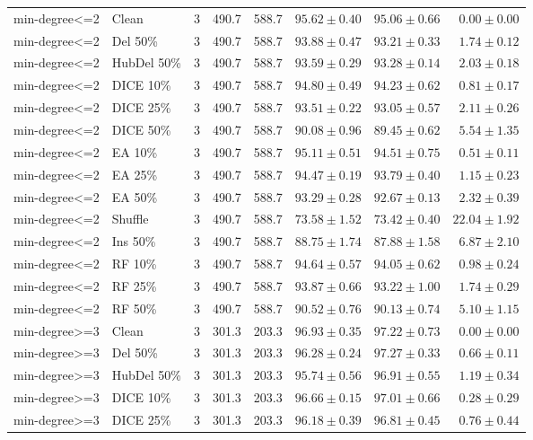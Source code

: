 {\begin{longtable}{llrrrrrr}
min-degree<=2 & Clean & 3 & 490.7 & 588.7 & $95.62\pm0.40$ & $95.06\pm0.66$ & $0.00\pm0.00$ \\
min-degree<=2 & Del 50\% & 3 & 490.7 & 588.7 & $93.88\pm0.47$ & $93.21\pm0.33$ & $1.74\pm0.12$ \\
min-degree<=2 & HubDel 50\% & 3 & 490.7 & 588.7 & $93.59\pm0.29$ & $93.28\pm0.14$ & $2.03\pm0.18$ \\
min-degree<=2 & DICE 10\% & 3 & 490.7 & 588.7 & $94.80\pm0.49$ & $94.23\pm0.62$ & $0.81\pm0.17$ \\
min-degree<=2 & DICE 25\% & 3 & 490.7 & 588.7 & $93.51\pm0.22$ & $93.05\pm0.57$ & $2.11\pm0.26$ \\
min-degree<=2 & DICE 50\% & 3 & 490.7 & 588.7 & $90.08\pm0.96$ & $89.45\pm0.62$ & $5.54\pm1.35$ \\
min-degree<=2 & EA 10\% & 3 & 490.7 & 588.7 & $95.11\pm0.51$ & $94.51\pm0.75$ & $0.51\pm0.11$ \\
min-degree<=2 & EA 25\% & 3 & 490.7 & 588.7 & $94.47\pm0.19$ & $93.79\pm0.40$ & $1.15\pm0.23$ \\
min-degree<=2 & EA 50\% & 3 & 490.7 & 588.7 & $93.29\pm0.28$ & $92.67\pm0.13$ & $2.32\pm0.39$ \\
min-degree<=2 & Shuffle & 3 & 490.7 & 588.7 & $73.58\pm1.52$ & $73.42\pm0.40$ & $22.04\pm1.92$ \\
min-degree<=2 & Ins 50\% & 3 & 490.7 & 588.7 & $88.75\pm1.74$ & $87.88\pm1.58$ & $6.87\pm2.10$ \\
min-degree<=2 & RF 10\% & 3 & 490.7 & 588.7 & $94.64\pm0.57$ & $94.05\pm0.62$ & $0.98\pm0.24$ \\
min-degree<=2 & RF 25\% & 3 & 490.7 & 588.7 & $93.87\pm0.66$ & $93.22\pm1.00$ & $1.74\pm0.29$ \\
min-degree<=2 & RF 50\% & 3 & 490.7 & 588.7 & $90.52\pm0.76$ & $90.13\pm0.74$ & $5.10\pm1.15$ \\
min-degree>=3 & Clean & 3 & 301.3 & 203.3 & $96.93\pm0.35$ & $97.22\pm0.73$ & $0.00\pm0.00$ \\
min-degree>=3 & Del 50\% & 3 & 301.3 & 203.3 & $96.28\pm0.24$ & $97.27\pm0.33$ & $0.66\pm0.11$ \\
min-degree>=3 & HubDel 50\% & 3 & 301.3 & 203.3 & $95.74\pm0.56$ & $96.91\pm0.55$ & $1.19\pm0.34$ \\
min-degree>=3 & DICE 10\% & 3 & 301.3 & 203.3 & $96.66\pm0.15$ & $97.01\pm0.66$ & $0.28\pm0.29$ \\
min-degree>=3 & DICE 25\% & 3 & 301.3 & 203.3 & $96.18\pm0.39$ & $96.81\pm0.45$ & $0.76\pm0.44$ \\

\end{longtable}}
